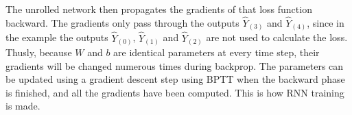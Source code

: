 The unrolled network then propagates the gradients of that loss function backward. The gradients only pass through the outputs $\hat{Y}_{(3)}$ and $\hat{Y}_{(4)}$, since in the example the outputs $\hat{Y}_{(0)}$, $\hat{Y}_{(1)}$ and $\hat{Y}_{(2)}$ are not used to calculate the loss. Thusly, because $W$ and $b$ are identical parameters at every time step, their gradients will be changed numerous times during backprop. The parameters can be updated using a gradient descent step using BPTT when the backward phase is finished, and all the gradients have been computed.
This is how RNN training is made. 
